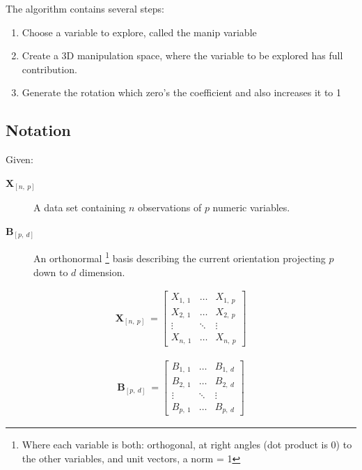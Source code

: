 \documentclass{monashthesis}
\begin{document}
The algorithm contains several steps:

\begin{enumerate}
\def\labelenumi{\arabic{enumi}.}
\tightlist
\item
  Choose a variable to explore, called the manip variable
\item
  Create a 3D manipulation space, where the variable to be explored has full contribution.
\item
  Generate the rotation which zero's the coefficient and also increases it to 1
\end{enumerate}

\hypertarget{notation}{%
\subsection{Notation}\label{notation}}

Given:

\begin{description}
  \item[$\textbf{X}_{[n,~p]}$] A data set containing $n$ observations of $p$ numeric variables. 
  \item[$\textbf{B}_{[p,~d]}$] An orthonormal \footnote{Where each variable is both: orthogonal, at right angles (dot product is 0) to the other variables, and unit vectors, a norm = 1} basis describing the current orientation projecting $p$ down to $d$ dimension.
\end{description}

\begin{align*}
  \textbf{X}_{[n,~p]} ~=
  \begin{bmatrix}
    X_{1,~1} & \dots  & X_{1,~p} \\
    X_{2,~1} & \dots  & X_{2,~p} \\
    \vdots   & \ddots & \vdots   \\
    X_{n,~1} & \dots  & X_{n,~p}
  \end{bmatrix}
\end{align*}

\begin{align*}
  \textbf{B}_{[p,~d]} ~=
  \begin{bmatrix}
    B_{1,~1} & \dots  & B_{1,~d} \\
    B_{2,~1} & \dots  & B_{2,~d} \\
    \vdots   & \ddots & \vdots   \\
    B_{p,~1} & \dots  & B_{p,~d}
  \end{bmatrix}
\end{align*}
\end{document}
